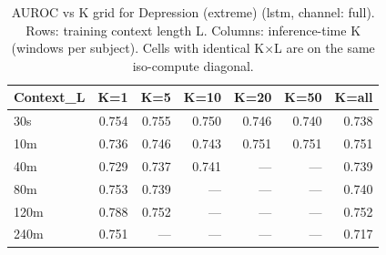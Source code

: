 \begin{table}[ht]
\centering
\caption{AUROC vs K grid for Depression (extreme) (lstm, channel: full). Rows: training context length L. Columns: inference-time K (windows per subject). Cells with identical K×L are on the same iso-compute diagonal.}
\label{tab:kgrid_depression_extreme_binary_lstm_full}
\begin{tabular}{lrrrrrr}
\toprule
Context_L & K=1 & K=5 & K=10 & K=20 & K=50 & K=all \\
\midrule
30s & 0.754 & 0.755 & 0.750 & 0.746 & 0.740 & 0.738 \\
10m & 0.736 & 0.746 & 0.743 & 0.751 & 0.751 & 0.751 \\
40m & 0.729 & 0.737 & 0.741 & — & — & 0.739 \\
80m & 0.753 & 0.739 & — & — & — & 0.740 \\
120m & 0.788 & 0.752 & — & — & — & 0.752 \\
240m & 0.751 & — & — & — & — & 0.717 \\
\bottomrule
\end{tabular}
\end{table}